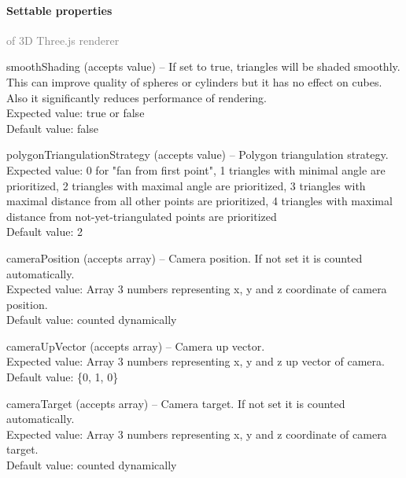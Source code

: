 	\paragraph{Settable properties}\textcolor{gray}{of 3D Three.js renderer}
	\begin{description*}
		\item[smoothShading]
		(accepts value)
			-- If set to true, triangles will be shaded smoothly.
            This can improve quality of spheres or cylinders but it has no effect on cubes.
            Also it significantly reduces performance of rendering.
			\\ Expected value: true or false
			\\ Default value: false
		\item[polygonTriangulationStrategy]
		(accepts value)
			-- Polygon triangulation strategy.
			\\ Expected value: 0 for "fan from first point",
            1 triangles with minimal angle are prioritized,
            2 triangles with maximal angle are prioritized,
            3 triangles with maximal distance from all other points are prioritized,
            4 triangles with maximal distance from not-yet-triangulated points are prioritized
			\\ Default value: 2
		\item[cameraPosition]
		(accepts array)
			-- Camera position. If not set it is counted automatically.
			\\ Expected value: Array 3 numbers representing x, y and z coordinate of camera position.
			\\ Default value: counted dynamically
		\item[cameraUpVector]
		(accepts array)
			-- Camera up vector.
			\\ Expected value: Array 3 numbers representing x, y and z up vector of camera.
			\\ Default value: \{0, 1, 0\}
		\item[cameraTarget]
		(accepts array)
			-- Camera target. If not set it is counted automatically.
			\\ Expected value: Array 3 numbers representing x, y and z coordinate of camera target.
			\\ Default value: counted dynamically
	\end{description*}
	



